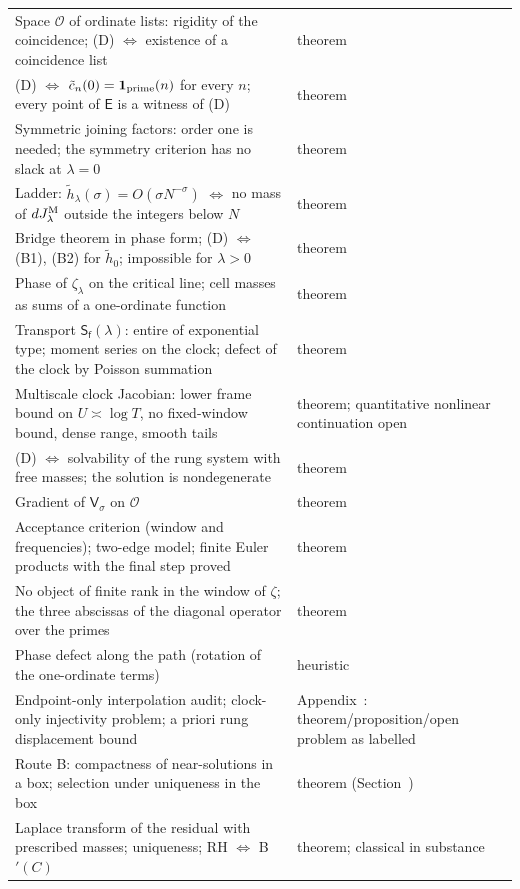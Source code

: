 \documentclass[11pt,reqno]{amsart}
\makeatletter
\let\CG@origref\ref
\newcommand{\CG@gettip}[1]{\@ifundefined{CGTip@#1}{Reference: #1}{\csname CGTip@#1\endcsname}}
\DeclareRobustCommand{\CGref}[1]{\pdftooltip{\CG@origref{#1}}{\CG@gettip{#1}}}
\numberwithin{equation}{section}
\theoremstyle{plain}
\theoremstyle{definition}
\theoremstyle{remark}
\makeatother
\begin{document}
\begin{longtable}{p{}p{}}
Space $\mathscr O$ of ordinate lists: rigidity of the coincidence; (D) $\Leftrightarrow$ existence of a coincidence list & theorem\\
(D) $\Leftrightarrow$ $\tilde c_n(0)=\mathbf 1_{\rm prime}(n)$ for every $n$; every point of $\mathsf E$ is a witness of (D) & theorem\\
Symmetric joining factors: order one is needed; the symmetry criterion has no slack at $\lambda=0$ & theorem\\
Ladder: $\tilde h_\lambda(\sigma)=O(\sigma N^{-\sigma})$ $\Leftrightarrow$ no mass of $dJ^{\rm M}_\lambda$ outside the integers below $N$ & theorem\\
Bridge theorem in phase form; (D) $\Leftrightarrow$ \textup{(B1)}, \textup{(B2)} for $\tilde h_0$; impossible for $\lambda>0$ & theorem\\
Phase of $\zeta_\lambda$ on the critical line; cell masses as sums of a one-ordinate function & theorem\\
Transport $\mathsf S_{\mathsf f}(\lambda)$: entire of exponential type; moment series on the clock; defect of the clock by Poisson summation & theorem\\
Multiscale clock Jacobian: lower frame bound on $U\asymp\log T$, no fixed-window bound, dense range, smooth tails & theorem; quantitative nonlinear continuation open\\
(D) $\Leftrightarrow$ solvability of the rung system with free masses; the solution is nondegenerate & theorem\\
Gradient of $\mathsf V_\sigma$ on $\mathscr O$ & theorem\\
Acceptance criterion (window and frequencies); two-edge model; finite Euler products with the final step proved & theorem\\
No object of finite rank in the window of $\zeta$; the three abscissas of the diagonal operator over the primes & theorem\\
Phase defect along the path (rotation of the one-ordinate terms) & heuristic\\
Endpoint-only interpolation audit; clock-only injectivity problem; a priori rung displacement bound & Appendix~\CGref{sec:appendix-endpoint-v18}: theorem/proposition/open problem as labelled\\
Route B: compactness of near-solutions in a box; selection under uniqueness in the box & theorem (Section~\CGref{sec:routeB-finite})\\
Laplace transform of the residual with prescribed masses; uniqueness; RH $\Leftrightarrow$ B$'(C)$ & theorem; classical in substance\\

\end{longtable}
\end{document}

